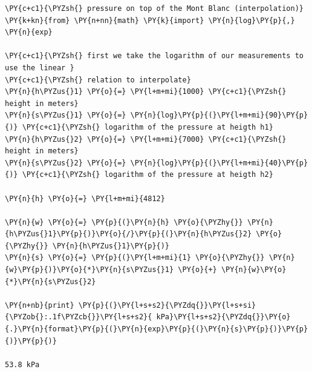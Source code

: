 \begin{tcolorbox}[breakable, size=fbox, boxrule=1pt, pad at break*=1mm,colback=cellbackground, colframe=cellborder]
\begin{Verbatim}[commandchars=\\\{\}]
\PY{c+c1}{\PYZsh{} pressure on top of the Mont Blanc (interpolation)}
\PY{k+kn}{from} \PY{n+nn}{math} \PY{k}{import} \PY{n}{log}\PY{p}{,} \PY{n}{exp}

\PY{c+c1}{\PYZsh{} first we take the logarithm of our measurements to use the linear }
\PY{c+c1}{\PYZsh{} relation to interpolate}
\PY{n}{h\PYZus{}1} \PY{o}{=} \PY{l+m+mi}{1000} \PY{c+c1}{\PYZsh{} height in meters}
\PY{n}{s\PYZus{}1} \PY{o}{=} \PY{n}{log}\PY{p}{(}\PY{l+m+mi}{90}\PY{p}{)} \PY{c+c1}{\PYZsh{} logarithm of the pressure at heigth h1}
\PY{n}{h\PYZus{}2} \PY{o}{=} \PY{l+m+mi}{7000} \PY{c+c1}{\PYZsh{} height in meters}
\PY{n}{s\PYZus{}2} \PY{o}{=} \PY{n}{log}\PY{p}{(}\PY{l+m+mi}{40}\PY{p}{)} \PY{c+c1}{\PYZsh{} logarithm of the pressure at heigth h2}

\PY{n}{h} \PY{o}{=} \PY{l+m+mi}{4812}

\PY{n}{w} \PY{o}{=} \PY{p}{(}\PY{n}{h} \PY{o}{\PYZhy{}} \PY{n}{h\PYZus{}1}\PY{p}{)}\PY{o}{/}\PY{p}{(}\PY{n}{h\PYZus{}2} \PY{o}{\PYZhy{}} \PY{n}{h\PYZus{}1}\PY{p}{)}
\PY{n}{s} \PY{o}{=} \PY{p}{(}\PY{l+m+mi}{1} \PY{o}{\PYZhy{}} \PY{n}{w}\PY{p}{)}\PY{o}{*}\PY{n}{s\PYZus{}1} \PY{o}{+} \PY{n}{w}\PY{o}{*}\PY{n}{s\PYZus{}2}

\PY{n+nb}{print} \PY{p}{(}\PY{l+s+s2}{\PYZdq{}}\PY{l+s+si}{\PYZob{}:.1f\PYZcb{}}\PY{l+s+s2}{ kPa}\PY{l+s+s2}{\PYZdq{}}\PY{o}{.}\PY{n}{format}\PY{p}{(}\PY{n}{exp}\PY{p}{(}\PY{n}{s}\PY{p}{)}\PY{p}{)}\PY{p}{)}

53.8 kPa
\end{Verbatim}
\end{tcolorbox}

